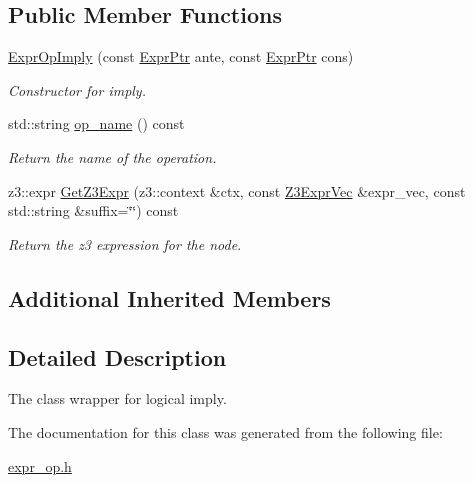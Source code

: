 \subsection*{Public Member Functions}
\begin{DoxyCompactItemize}
\item 
\mbox{\label{classilang_1_1_expr_op_imply_aa4902228b134ec166b3429f6f474d84d}} 
\mbox{\hyperlink{classilang_1_1_expr_op_imply_aa4902228b134ec166b3429f6f474d84d}{Expr\+Op\+Imply}} (const \mbox{\hyperlink{classilang_1_1_expr_a85952b6a34620c4c8cab6bac9c9fdf8c}{Expr\+Ptr}} ante, const \mbox{\hyperlink{classilang_1_1_expr_a85952b6a34620c4c8cab6bac9c9fdf8c}{Expr\+Ptr}} cons)
\begin{DoxyCompactList}\small\item\em Constructor for imply. \end{DoxyCompactList}\item 
\mbox{\label{classilang_1_1_expr_op_imply_a36930ad00ec576c332bc3d0f325e86cb}} 
std\+::string \mbox{\hyperlink{classilang_1_1_expr_op_imply_a36930ad00ec576c332bc3d0f325e86cb}{op\+\_\+name}} () const
\begin{DoxyCompactList}\small\item\em Return the name of the operation. \end{DoxyCompactList}\item 
\mbox{\label{classilang_1_1_expr_op_imply_abeb3591b65cc86ec4ee95fc99cc61bab}} 
z3\+::expr \mbox{\hyperlink{classilang_1_1_expr_op_imply_abeb3591b65cc86ec4ee95fc99cc61bab}{Get\+Z3\+Expr}} (z3\+::context \&ctx, const \mbox{\hyperlink{namespaceilang_adc4eee919aa24fff882d03a48d733c19}{Z3\+Expr\+Vec}} \&expr\+\_\+vec, const std\+::string \&suffix=\char`\"{}\char`\"{}) const
\begin{DoxyCompactList}\small\item\em Return the z3 expression for the node. \end{DoxyCompactList}\end{DoxyCompactItemize}
\subsection*{Additional Inherited Members}


\subsection{Detailed Description}
The class wrapper for logical imply. 

The documentation for this class was generated from the following file\+:\begin{DoxyCompactItemize}
\item 
\mbox{\hyperlink{expr__op_8h}{expr\+\_\+op.\+h}}\end{DoxyCompactItemize}
